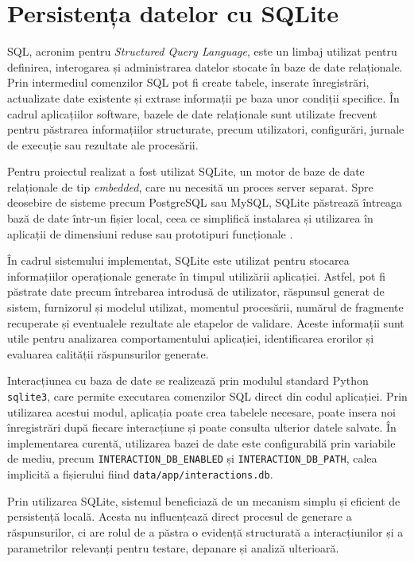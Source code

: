 \documentclass[12pt, a4paper, oneside, romanian]{teza-upb}
\begin{document}
\section{Persistența datelor cu SQLite}

SQL, acronim pentru \textit{Structured Query Language}, este un limbaj utilizat pentru definirea, interogarea și administrarea datelor stocate în baze de date relaționale. Prin intermediul comenzilor SQL pot fi create tabele, inserate înregistrări, actualizate date existente și extrase informații pe baza unor condiții specifice. În cadrul aplicațiilor software, bazele de date relaționale sunt utilizate frecvent pentru păstrarea informațiilor structurate, precum utilizatori, configurări, jurnale de execuție sau rezultate ale procesării.

Pentru proiectul realizat a fost utilizat SQLite, un motor de baze de date relaționale de tip \textit{embedded}, care nu necesită un proces server separat. Spre deosebire de sisteme precum PostgreSQL sau MySQL, SQLite păstrează întreaga bază de date într-un fișier local, ceea ce simplifică instalarea și utilizarea în aplicații de dimensiuni reduse sau prototipuri funcționale \cite{sqlite_doc}. 

În cadrul sistemului implementat, SQLite este utilizat pentru stocarea informațiilor operaționale generate în timpul utilizării aplicației. Astfel, pot fi păstrate date precum întrebarea introdusă de utilizator, răspunsul generat de sistem, furnizorul și modelul utilizat, momentul procesării, numărul de fragmente recuperate și eventualele rezultate ale etapelor de validare. Aceste informații sunt utile pentru analizarea comportamentului aplicației, identificarea erorilor și evaluarea calității răspunsurilor generate.

Interacțiunea cu baza de date se realizează prin modulul standard Python \texttt{sqlite3}, care permite executarea comenzilor SQL direct din codul aplicației. Prin utilizarea acestui modul, aplicația poate crea tabelele necesare, poate insera noi înregistrări după fiecare interacțiune și poate consulta ulterior datele salvate. În implementarea curentă, utilizarea bazei de date este configurabilă prin variabile de mediu, precum \texttt{INTERACTION\_DB\_ENABLED} și \texttt{INTERACTION\_DB\_PATH}, calea implicită a fișierului fiind \texttt{data/app/interactions.db}.

Prin utilizarea SQLite, sistemul beneficiază de un mecanism simplu și eficient de persistență locală. Acesta nu influențează direct procesul de generare a răspunsurilor, ci are rolul de a păstra o evidență structurată a interacțiunilor și a parametrilor relevanți pentru testare, depanare și analiză ulterioară.
\end{document}
